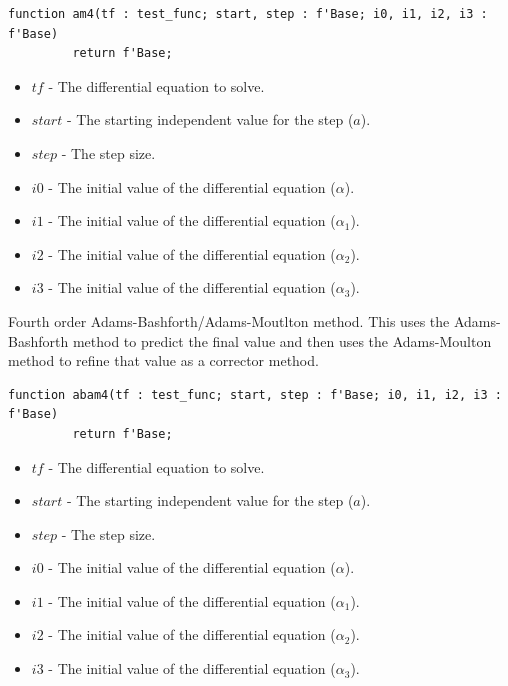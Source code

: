 \documentclass[10pt, openany]{book}
\newcommand{\indexfunc}[1]{\index[func]{#1}}
\begin{document}
\begin{lstlisting}
function am4(tf : test_func; start, step : f'Base; i0, i1, i2, i3 : f'Base)
         return f'Base;
\end{lstlisting}
\indexfunc{ode-am4}
\begin{itemize}
  \item $tf$ - The differential equation to solve.
  \item $start$ - The starting independent value for the step ($a$).
  \item $step$ - The step size.
  \item $i0$ - The initial value of the differential equation ($\alpha$).
  \item $i1$ - The initial value of the differential equation ($\alpha_1$).
  \item $i2$ - The initial value of the differential equation ($\alpha_2$).
  \item $i3$ - The initial value of the differential equation ($\alpha_3$).
\end{itemize}

Fourth order Adams-Bashforth/Adams-Moutlton method.  This uses the Adams-Bashforth method to predict the final value and then uses the Adams-Moulton method to refine that value as a corrector method.

\begin{lstlisting}
function abam4(tf : test_func; start, step : f'Base; i0, i1, i2, i3 : f'Base)
         return f'Base;
\end{lstlisting}
\indexfunc{ode-abam4}
\begin{itemize}
  \item $tf$ - The differential equation to solve.
  \item $start$ - The starting independent value for the step ($a$).
  \item $step$ - The step size.
  \item $i0$ - The initial value of the differential equation ($\alpha$).
  \item $i1$ - The initial value of the differential equation ($\alpha_1$).
  \item $i2$ - The initial value of the differential equation ($\alpha_2$).
  \item $i3$ - The initial value of the differential equation ($\alpha_3$).
\end{itemize}
\end{document}
